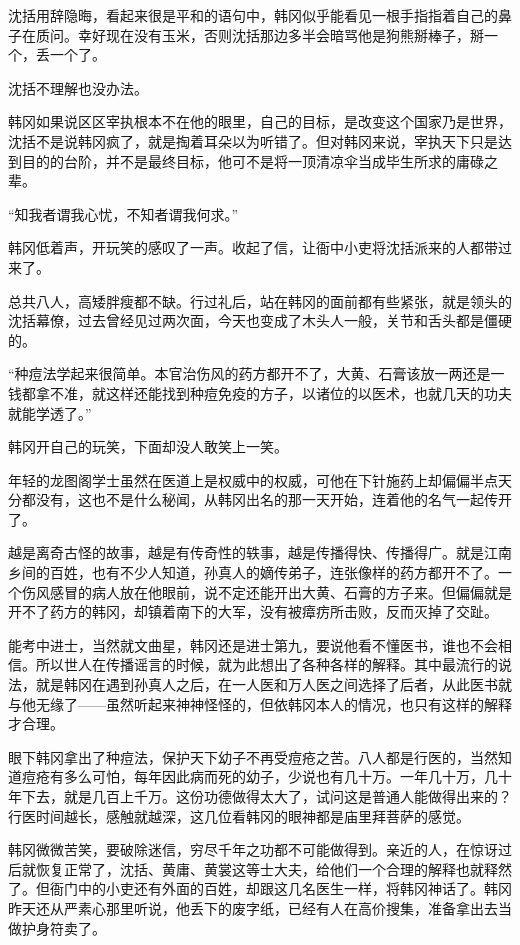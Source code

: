 沈括用辞隐晦，看起来很是平和的语句中，韩冈似乎能看见一根手指指着自己的鼻子在质问。幸好现在没有玉米，否则沈括那边多半会暗骂他是狗熊掰棒子，掰一个，丢一个了。

沈括不理解也没办法。

韩冈如果说区区宰执根本不在他的眼里，自己的目标，是改变这个国家乃是世界，沈括不是说韩冈疯了，就是掏着耳朵以为听错了。但对韩冈来说，宰执天下只是达到目的的台阶，并不是最终目标，他可不是将一顶清凉伞当成毕生所求的庸碌之辈。

“知我者谓我心忧，不知者谓我何求。”

韩冈低着声，开玩笑的感叹了一声。收起了信，让衙中小吏将沈括派来的人都带过来了。

总共八人，高矮胖瘦都不缺。行过礼后，站在韩冈的面前都有些紧张，就是领头的沈括幕僚，过去曾经见过两次面，今天也变成了木头人一般，关节和舌头都是僵硬的。

“种痘法学起来很简单。本官治伤风的药方都开不了，大黄、石膏该放一两还是一钱都拿不准，就这样还能找到种痘免疫的方子，以诸位的以医术，也就几天的功夫就能学透了。”

韩冈开自己的玩笑，下面却没人敢笑上一笑。

年轻的龙图阁学士虽然在医道上是权威中的权威，可他在下针施药上却偏偏半点天分都没有，这也不是什么秘闻，从韩冈出名的那一天开始，连着他的名气一起传开了。

越是离奇古怪的故事，越是有传奇性的轶事，越是传播得快、传播得广。就是江南乡间的百姓，也有不少人知道，孙真人的嫡传弟子，连张像样的药方都开不了。一个伤风感冒的病人放在他眼前，说不定还能开出大黄、石膏的方子来。但偏偏就是开不了药方的韩冈，却镇着南下的大军，没有被瘴疠所击败，反而灭掉了交趾。

能考中进士，当然就文曲星，韩冈还是进士第九，要说他看不懂医书，谁也不会相信。所以世人在传播谣言的时候，就为此想出了各种各样的解释。其中最流行的说法，就是韩冈在遇到孙真人之后，在一人医和万人医之间选择了后者，从此医书就与他无缘了——虽然听起来神神怪怪的，但依韩冈本人的情况，也只有这样的解释才合理。

眼下韩冈拿出了种痘法，保护天下幼子不再受痘疮之苦。八人都是行医的，当然知道痘疮有多么可怕，每年因此病而死的幼子，少说也有几十万。一年几十万，几十年下去，就是几百上千万。这份功德做得太大了，试问这是普通人能做得出来的？行医时间越长，感触就越深，这几位看韩冈的眼神都是庙里拜菩萨的感觉。

韩冈微微苦笑，要破除迷信，穷尽千年之功都不可能做得到。亲近的人，在惊讶过后就恢复正常了，沈括、黄庸、黄裳这等士大夫，给他们一个合理的解释也就释然了。但衙门中的小吏还有外面的百姓，却跟这几名医生一样，将韩冈神话了。韩冈昨天还从严素心那里听说，他丢下的废字纸，已经有人在高价搜集，准备拿出去当做护身符卖了。

